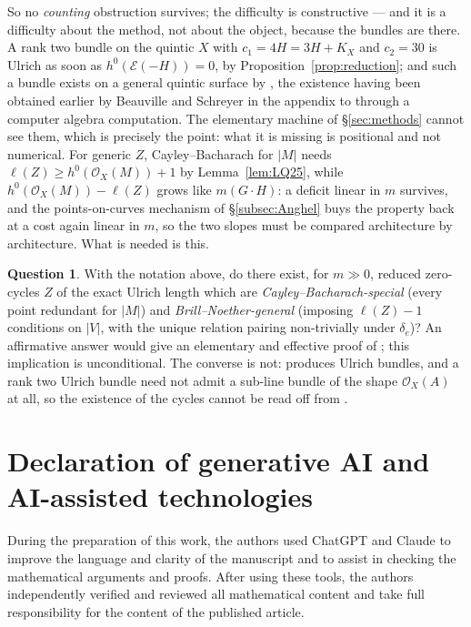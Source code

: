 \documentclass{amsart}
\theoremstyle{definition}
\newtheorem{question}[theorem]{Question}
\newcommand{\OO}{\mathcal{O}}
\newcommand{\EE}{\mathcal{E}}
\newcommand{\len}{\ell}
\begin{document}
So no \emph{counting} obstruction survives; the difficulty is constructive --- and it is a difficulty about the method, not about the object, because the bundles are there. A rank two bundle on the quintic $X$ with $c_1=4H=3H+K_X$ and $c_2=30$ is Ulrich as soon as $h^0(\EE(-H))=0$, by Proposition~\ref{prop:reduction}; and such a bundle exists on a general quintic surface by \cite[Thm.~6.13]{CF09}, the existence having been obtained earlier by Beauville and Schreyer in the appendix to \cite{Bea00} through a computer algebra computation. The elementary machine of \S\ref{sec:methods} cannot see them, which is precisely the point: what it is missing is positional and not numerical. For generic $Z$, Cayley--Bacharach for $|M|$ needs $\len(Z)\ge h^0(\OO_X(M))+1$ by Lemma~\ref{lem:LQ25}, while $h^0(\OO_X(M))-\len(Z)$ grows like $m(G\cdot H)$: a deficit linear in $m$ survives, and the points-on-curves mechanism of \S\ref{subsec:Anghel} buys the property back at a cost again linear in $m$, so the two slopes must be compared architecture by architecture. What is needed is this.

\begin{question}\label{q:cycles}
With the notation above, do there exist, for $m\gg0$, reduced zero-cycles $Z$ of the exact Ulrich length which are \emph{Cayley--Bacharach-special} \textup{(}every point redundant for $|M|$\textup{)} and \emph{Brill--Noether-general} \textup{(}imposing $\len(Z)-1$ conditions on $|V|$, with the unique relation pairing non-trivially under $\delta_e$\textup{)}? An affirmative answer would give an elementary and effective proof of \cite[Thm.~1.2]{CH20}; this implication is unconditional. The converse is not: \cite{CH20} produces Ulrich bundles, and a rank two Ulrich bundle need not admit a sub-line bundle of the shape $\OO_X(A)$ at all, so the existence of the cycles cannot be read off from \cite{CH20}.
\end{question}




\section*{Declaration of generative AI and AI-assisted technologies}

During the preparation of this work, the authors used ChatGPT and Claude to improve the language and clarity of the manuscript and to assist in checking the mathematical arguments and proofs. After using these tools, the authors independently verified and reviewed all mathematical content and take full responsibility for the content of the published article.
\end{document}
